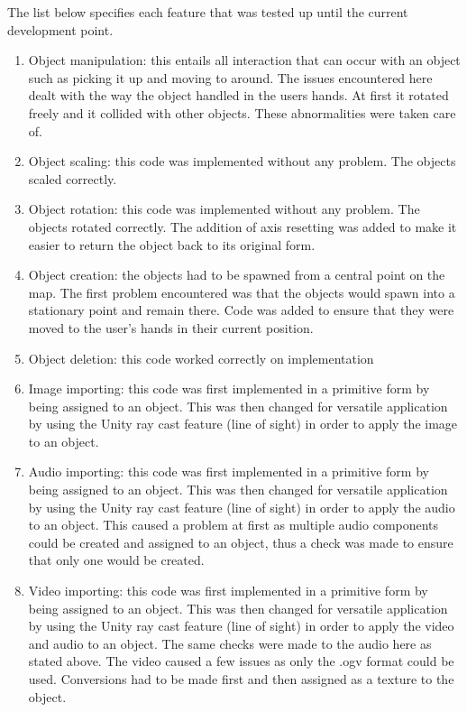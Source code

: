 \documentclass{article}
\begin{document}
	\begin{flushleft}
		The list below specifies each feature that was tested up until the current development point.
		\begin{enumerate}
			\item Object manipulation: this entails all interaction that can occur with an object such as picking it up and moving to around. The issues encountered here
			dealt with the way the object handled in the users hands. At first it rotated freely and it collided with other objects. These abnormalities were taken care of.
			\item Object scaling: this code was implemented without any problem. The objects scaled correctly.
			\item Object rotation: this code was implemented without any problem. The objects rotated correctly. The addition of axis resetting was added to make it easier
			to return the object back to its original form.
			\item Object creation: the objects had to be spawned from a central point on the map. The first problem encountered was that the objects would spawn into a stationary
			point and remain there. Code was added to ensure that they were moved to the user's hands in their current position.
			\item Object deletion: this code worked correctly on implementation
		 	\item Image importing: this code was first implemented in a primitive form by being assigned to an object. This was then changed for versatile application by using the Unity
			ray cast feature (line of sight) in order to apply the image to an object.
			\item Audio importing: this code was first implemented in a primitive form by being assigned to an object. This was then changed for versatile application by using the Unity
			ray cast feature (line of sight) in order to apply the audio to an object. This caused a problem at first as multiple audio components could be created and assigned to an
			object, thus a check was made to ensure that only one would be created.
			\item Video importing: this code was first implemented in a primitive form by being assigned to an object. This was then changed for versatile application by using the Unity
			ray cast feature (line of sight) in order to apply the video and audio to an object. The same checks were made to the audio here as stated above. The video caused a few issues
			as only the .ogv format could be used. Conversions had to be made first and then assigned as a texture to the object.

\end{enumerate}
\end{flushleft}
\end{document}
